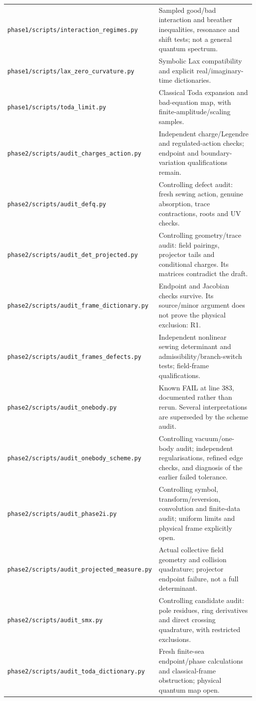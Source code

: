 \documentclass[11pt,a4paper]{article}
\newcommand{\file}[1]{\nolinkurl{#1}}
\begin{document}
\begin{longtable}{@{}L{6.0cm}L{9.2cm}@{}}
\file{phase1/scripts/interaction_regimes.py} & Sampled good/bad interaction and breather inequalities, resonance and shift tests; not a general quantum spectrum.\\
\file{phase1/scripts/lax_zero_curvature.py} & Symbolic Lax compatibility and explicit real/imaginary-time dictionaries.\\
\file{phase1/scripts/toda_limit.py} & Classical Toda expansion and bad-equation map, with finite-amplitude/scaling samples.\\
\file{phase2/scripts/audit_charges_action.py} & Independent charge/Legendre and regulated-action checks; endpoint and boundary-variation qualifications remain.\\
\file{phase2/scripts/audit_defq.py} & Controlling defect audit: fresh sewing action, genuine absorption, trace contractions, roots and UV checks.\\
\file{phase2/scripts/audit_det_projected.py} & Controlling geometry/trace audit: field pairings, projector tails and conditional charges. Its matrices contradict the draft.\\
\file{phase2/scripts/audit_frame_dictionary.py} & Endpoint and Jacobian checks survive. Its source/minor argument does not prove the physical exclusion: R1.\\
\file{phase2/scripts/audit_frames_defects.py} & Independent nonlinear sewing determinant and admissibility/branch-switch tests; field-frame qualifications.\\
\file{phase2/scripts/audit_onebody.py} & Known FAIL at line 383, documented rather than rerun. Several interpretations are superseded by the scheme audit.\\
\file{phase2/scripts/audit_onebody_scheme.py} & Controlling vacuum/one-body audit; independent regularisations, refined edge checks, and diagnosis of the earlier failed tolerance.\\
\file{phase2/scripts/audit_phase2i.py} & Controlling symbol, transform/reversion, convolution and finite-data audit; uniform limits and physical frame explicitly open.\\
\file{phase2/scripts/audit_projected_measure.py} & Actual collective field geometry and collision quadrature; projector endpoint failure, not a full determinant.\\
\file{phase2/scripts/audit_smx.py} & Controlling candidate audit: pole residues, ring derivatives and direct crossing quadrature, with restricted exclusions.\\
\file{phase2/scripts/audit_toda_dictionary.py} & Fresh finite-sea endpoint/phase calculations and classical-frame obstruction; physical quantum map open.\\

\end{longtable}
\end{document}
